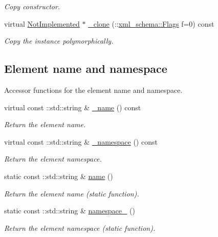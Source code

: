 \begin{DoxyCompactItemize}
\begin{DoxyCompactList}\small\item\em Copy constructor. \item\end{DoxyCompactList}\item 
virtual \hyperlink{classopenstack_1_1xml_1_1NotImplemented}{NotImplemented} $\ast$ \hyperlink{classopenstack_1_1xml_1_1NotImplemented_a058f84a0f1fcc3aa1ec0e9745df1b083}{\_\-clone} (::\hyperlink{namespacexml__schema_affb4c227cbd9aa7453dd1dc5a1401943}{xml\_\-schema::Flags} f=0) const 
\begin{DoxyCompactList}\small\item\em Copy the instance polymorphically. \item\end{DoxyCompactList}\end{DoxyCompactItemize}
\subsection*{Element name and namespace}
\label{_amgrpd4b5b61f6e07390f4af2465e04571f34}
Accessor functions for the element name and namespace. \begin{DoxyCompactItemize}
\item 
virtual const ::std::string \& \hyperlink{classopenstack_1_1xml_1_1NotImplemented_a9b02c873d5185fafd708f82bf47a7a2c}{\_\-name} () const 
\begin{DoxyCompactList}\small\item\em Return the element name. \item\end{DoxyCompactList}\item 
virtual const ::std::string \& \hyperlink{classopenstack_1_1xml_1_1NotImplemented_a1014878cda56695f29ff837d7b78362b}{\_\-namespace} () const 
\begin{DoxyCompactList}\small\item\em Return the element namespace. \item\end{DoxyCompactList}\item 
static const ::std::string \& \hyperlink{classopenstack_1_1xml_1_1NotImplemented_a28132cafe3beaf7ed9d72f88e03a1413}{name} ()
\begin{DoxyCompactList}\small\item\em Return the element name (static function). \item\end{DoxyCompactList}\item 
static const ::std::string \& \hyperlink{classopenstack_1_1xml_1_1NotImplemented_a8c91afaff8298f7db6944485d1d83dbf}{namespace\_\-} ()
\begin{DoxyCompactList}\small\item\em Return the element namespace (static function). \item\end{DoxyCompactList}\end{DoxyCompactItemize}



